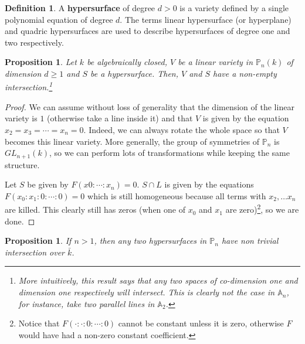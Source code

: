 \documentclass{tufte-handout} %
\newtheorem{prop}[thm]{Proposition}
\theoremstyle{definition}
\newtheorem{defn}[thm]{Definition}
\theoremstyle{remark}
\newcommand{\bA}{\mathbb{A}}
\renewcommand{\P}{\mathbb{P}}
\begin{document}
\begin{defn}
	A \textbf{hypersurface} of degree $d>0$ is a variety defined by a single polynomial equation of degree $d$. The terms linear hypersurface (or hyperplane) and quadric hypersurfaces are used to describe hypersurfaces of degree one and two respectively.
\end{defn}
\begin{prop}
	Let $k$ be algebraically closed, $V$ be a linear variety in $\P_n(k)$ of dimension $d \geq 1$ and $S$ be a hypersurface. Then, $V$ and $S$ have a non-empty intersection.\footnote{More intuitively, this result says that any two spaces of co-dimension one and dimension one respectively will intersect. This is clearly not the case in $\bA_n$, for instance, take two parallel lines in $\bA_2$.}
\end{prop}
\begin{proof}
	We can assume without loss of generality that the dimension of the linear variety is $1$ (otherwise take a line inside it) and that $V$ is given by the equation $x_2 = x_3 = \cdots = x_n = 0$. Indeed, we can always rotate the whole space so that $V$ becomes this linear variety. More generally, the group of symmetries of $\P_n$ is $GL_{n+1}(k)$, so we can perform lots of transformations while keeping the same structure.
	
	Let $S$ be given by $F(x0: \cdots : x_n) = 0$. $S \cap L$ is given by the equations $F(x_0:x_1: 0: \cdots :0) = 0$ which is still homogeneous because all terms with $x_2,\dots x_n$ are killed. This clearly still has zeros (when one of $x_0$ and $x_1$ are zero)\footnote{Notice that $F(\cdot : \cdot : 0: \cdots : 0)$ cannot be constant unless it is zero, otherwise $F$ would have had a non-zero constant coefficient.}, so we are done.
\end{proof}
\begin{prop}
	If $n > 1$, then any two hypersurfaces in $\P_n$ have non trivial intersection over $\bar{k}$.
\end{prop}
\end{document}
